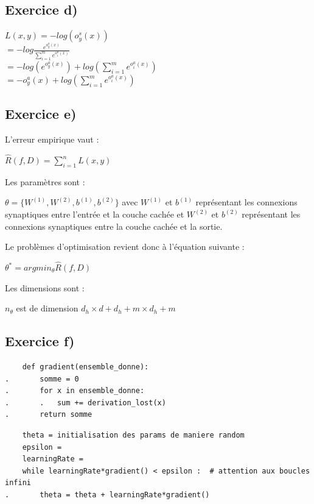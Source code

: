 \documentclass[a4paper,10pt]{article}
\begin{document}
\subsection{Exercice d)}

$ L(x,y) = -log  (o^{s}_{y}(x)) $
\\[6pt]
$= -log \frac{e^{o^{a}_{y}(x)}}{\sum_{i=1}^{m} e^{o^{a}_{i}(x)}}$ 
\\[6pt]
$= -log(e^{o^{a}_{y}(x)}) +log(\sum_{i=1}^{m} e^{o^{a}_{i}(x)})  $
\\[6pt]
$ = -o^{a}_{y}(x) + log(\sum_{i=1}^{m} e^{o^{a}_{i}(x)})$

\subsection{Exercice e)} 

L'erreur empirique vaut :

$\widehat{R}(f,D) = \sum_{i=1}^{n} L(x,y)$


Les paramètres sont :

$ \theta = \{ W^{(1)},W^{(2)},b^{(1)},b^{(2)} \}$ avec $W^{(1)}$ et $b^{(1)}$ représentant les connexions synaptiques entre l'entrée et la couche cachée et $W^{(2)}$ et $b^{(2)}$ représentant les connexions synaptiques entre la couche cachée et la sortie.

Le problèmes d'optimisation revient donc à l'équation suivante :

$\theta^{*} = argmin_{\theta} \widehat{R}(f,D) $

Les dimensions sont :

$n_{\theta}$ est de dimension $d_{h} \times d + d_{h} + m \times d_{h} + m$

\subsection{Exercice f)} 

\begin{verbatim}
	def gradient(ensemble_donne):
.		somme = 0
.		for x in ensemble_donne:
.		.	sum += derivation_lost(x)
.		return somme
\end{verbatim}

\begin{verbatim}
	theta = initialisation des params de maniere random
	epsilon =
	learningRate =
	while learningRate*gradient() < epsilon :  # attention aux boucles infini
.		theta = theta + learningRate*gradient()
\end{verbatim}
\end{document}
